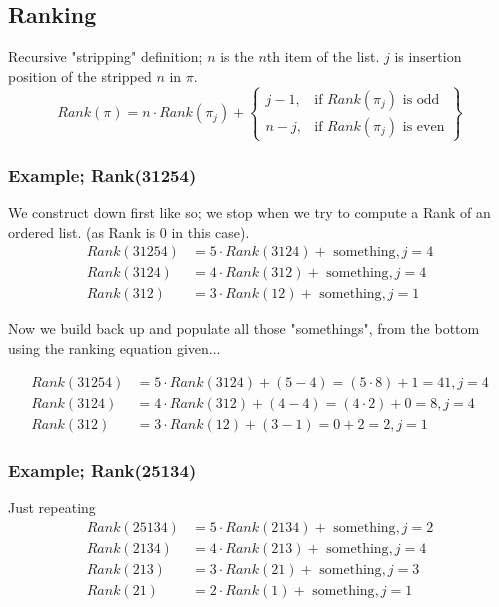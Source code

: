\documentclass{article}
\begin{document}

\subsection*{Ranking}
Recursive "stripping" definition; $n$ is the $n$th item of the list. $j$ is insertion position of the stripped $n$ in $\pi$.
  \[
    Rank(\pi) = n \cdot Rank(\pi_j) +
		\left\{\begin{array}{lr}
										j-1, & \text{if } Rank(\pi_j) \text{ is odd}\\
										n-j, & \text{if } Rank(\pi_j) \text{ is even}
        \end{array} \right\}
  \]

\subsubsection*{Example; Rank(31254)}
We construct down first like so; we stop when we try to compute a Rank of an ordered list. (as Rank is 0 in this case).
\begin{align}
				Rank(31254) &= 5 \cdot Rank(3124) + \text{ something}, j=4 \\
				Rank(3124) &= 4 \cdot Rank(312) + \text{ something}, j=4 \\
				Rank(312) &= 3 \cdot Rank(12) + \text{ something}, j=1
\end{align}

Now we build back up and populate all those "somethings", from the bottom using the ranking equation given...

\begin{align}
				Rank(31254) &= 5 \cdot Rank(3124) + (5 - 4) = (5 \cdot 8) + 1 = 41, j=4 \\
				Rank(3124) &= 4 \cdot Rank(312) + (4 - 4) = (4 \cdot 2) + 0 = 8, j=4 \\
				Rank(312) &= 3 \cdot Rank(12) + (3 - 1) = 0 + 2 = 2, j=1
\end{align}

\subsubsection*{Example; Rank(25134)}
Just repeating
\begin{align}
				Rank(25134) &= 5 \cdot Rank(2134) + \text{ something}, j=2 \\
				Rank(2134) &= 4 \cdot Rank(213) + \text{ something}, j=4 \\
				Rank(213) &= 3 \cdot Rank(21) + \text{ something}, j=3 \\
				Rank(21) &= 2 \cdot Rank(1) + \text{ something}, j=1
\end{align}
\end{document}
